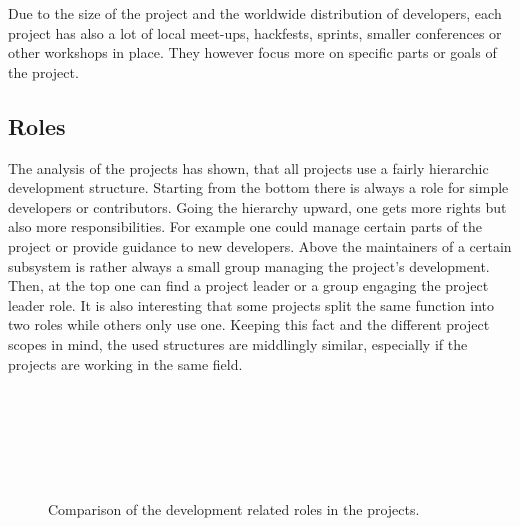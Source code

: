 Due to the size of the project and the worldwide distribution of developers,
each project has also a lot of local meet-ups, hackfests, sprints, smaller
conferences or other workshops in place. They however focus more on specific
parts or goals of the project.


\subsection{Roles} %

The analysis of the projects has shown, that all projects use a fairly
hierarchic development structure. Starting from the bottom there is always a
role for simple developers or contributors. Going the hierarchy upward, one
gets more rights but also more responsibilities. For example one could manage
certain parts of the project or provide guidance to new developers. Above the
maintainers of a certain subsystem is rather always a small group managing the
project's development. Then, at the top one can find a project leader or a
group engaging the project leader role. It is also interesting that some
projects split the same function into two roles while others only use one.
Keeping this fact and the different project scopes in mind, the used structures
are middlingly similar, especially if the projects are working in the same
field.

\begin{figure}[htbp]
  \centering
   \qquad
   \\

   \qquad
   \\

   \qquad
   \\

   \qquad
   \\

   \qquad
   \\
  \caption{Comparison of the development related roles in the projects.}
\end{figure}

